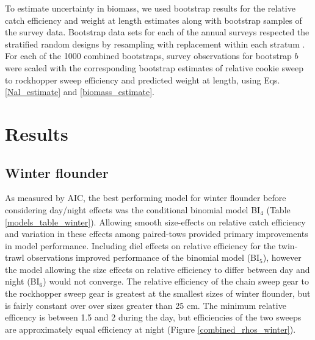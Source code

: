 \documentclass[12pt,letterpaper, leqno]{article}
\begin{document}
To estimate uncertainty in biomass, we used bootstrap results for the relative catch efficiency and weight at length estimates along with bootstrap samples of the survey data.  Bootstrap data sets for each of the annual surveys respected the stratified random designs by resampling with replacement within each stratum \citep{smith97}. For each of the 1000 combined bootstraps, survey observations for bootstrap $b$ were scaled with the corresponding bootstrap estimates of relative cookie sweep to rockhopper sweep efficiency and predicted weight at length, using Eqs. \ref{Nal_estimate} and \ref{biomass_estimate}.

\section*{Results}

\subsection*{Winter flounder}

As measured by AIC, the best performing model for winter flounder before considering day/night effects was the conditional binomial model BI$_4$ (Table \ref{models_table_winter}). Allowing smooth size-effects on relative catch efficiency and variation in these effects among paired-tows provided primary improvements in model performance. Including diel effects on relative efficiency for the twin-trawl observations improved performance of the binomial model (BI$_5$), however the model allowing the size effects on relative efficiency to differ between day and night (BI$_6$) would not converge. The relative efficiency of the chain sweep gear to the rockhopper sweep gear is greatest at the smallest sizes of winter flounder, but is fairly constant over over sizes greater than 25 cm. The minimum relative efficency is between 1.5 and 2 during the day, but efficiencies of the two sweeps are approximately equal efficiency at night (Figure \ref{combined_rhos_winter}). 
\end{document}
